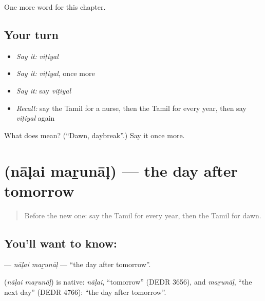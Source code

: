 \begin{grammarlens}[title={What you've built}]
One more word for this chapter.
\end{grammarlens}

\subsection*{Your turn}
\begin{itemize}
\raggedright
  \item \emph{Say it:} \emph{viṭiyal}
  \item \emph{Say it:} \emph{viṭiyal}, once more
  \item \emph{Say it:} say \emph{viṭiyal}
  \item \emph{Recall:} say the Tamil for a nurse, then the Tamil for every year, then say \emph{viṭiyal} again
\end{itemize}

\begin{tcolorbox}[breakable,colback=teal!4,colframe=teal!35!black,title={Before you move on}]
What does  mean? (\textquotedblleft{}Dawn, daybreak\textquotedblright{}.) Say it once more.
\end{tcolorbox}
\section[\texorpdfstring{\ta{நாளை} \ta{மறுநாள்} (nāḷai maṟunāḷ)}{நாளை மறுநாள் (nāḷai maṟunāḷ)}]{  (nāḷai maṟunāḷ) — the day after tomorrow}

\label{lesson:TA-C233-nalai-marunal}



\begin{quote}
Before the new one: say the Tamil for every year, then the Tamil for dawn.
\end{quote}

\subsection*{You'll want to know:  }
\textbf{ } — \emph{nāḷai maṟunāḷ} — \textquotedblleft{}the day after tomorrow\textquotedblright{}.

\begin{cousinweb}
\textbf{ } (\emph{nāḷai maṟunāḷ}) is native: \emph{nāḷai}, \textquotedblleft{}tomorrow\textquotedblright{} (DEDR 3656), and \emph{maṟunāḷ}, \textquotedblleft{}the next day\textquotedblright{} (DEDR 4766): \textquotedblleft{}the day after tomorrow\textquotedblright{}.
\end{cousinweb}

